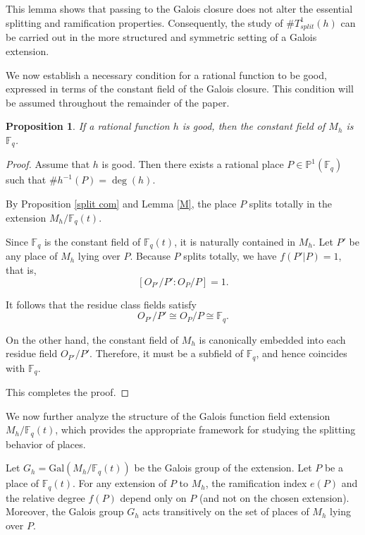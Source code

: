 \documentclass[1p,final]{elsarticle}
\newtheorem{proposition}[theorem]{Proposition}
\newtheorem{open problem}[theorem]{Open Problem}
\begin{document}
This lemma shows that passing to the Galois closure does not alter the essential splitting and ramification properties. Consequently, the study of $\#T^1_{split}(h)$ can be carried out in the more structured and symmetric setting of a Galois extension.

\medskip

We now establish a necessary condition for a rational function to be good, expressed in terms of the constant field of the Galois closure. This condition will be assumed throughout the remainder of the paper.

\begin{proposition}\label{not good}
If a rational function $h$ is good, then the constant field of $M_{h}$ is $\mathbb{F}_{q}$.
\end{proposition}

\begin{proof}
Assume that $h$ is good. Then there exists a rational place $P\in \mathbb{P}^{1}(\mathbb{F}_{q})$ such that $\# h^{-1}(P)= \deg(h)$. 

By Proposition \ref{split com} and Lemma \ref{M}, the place $P$ splits totally in the extension $M_{h}/\mathbb{F}_{q}(t)$. 

\medskip

Since $\mathbb{F}_{q}$ is the constant field of $\mathbb{F}_{q}(t)$, it is naturally contained in $M_{h}$. Let $P'$ be any place of $M_{h}$ lying over $P$. Because $P$ splits totally, we have $f(P'|P)=1$, that is,
\begin{equation}
\left [ O_{P'}/P':O_{P}/P\right ]=1.
\end{equation}

It follows that the residue class fields satisfy
\[
O_{P'}/P'\cong O_{P}/P\cong \mathbb{F}_{q}.
\]

\medskip

On the other hand, the constant field of $M_{h}$ is canonically embedded into each residue field $O_{P'}/P'$. Therefore, it must be a subfield of $\mathbb{F}_{q}$, and hence coincides with $\mathbb{F}_{q}$.

\medskip

This completes the proof.
\end{proof}
	
	We now further analyze the structure of the Galois function field extension $M_{h}/\mathbb{F}_q(t)$, which provides the appropriate framework for studying the splitting behavior of places.

\medskip

Let $G_{h}=\mathrm{Gal}(M_{h}/\mathbb{F}_q(t))$ be the Galois group of the extension. Let $P$ be a place of $\mathbb{F}_q(t)$. For any extension of $P$ to $M_{h}$, the ramification index $e(P)$ and the relative degree $f(P)$ depend only on $P$ (and not on the chosen extension). Moreover, the Galois group $G_{h}$ acts transitively on the set of places of $M_{h}$ lying over $P$.
\end{document}
